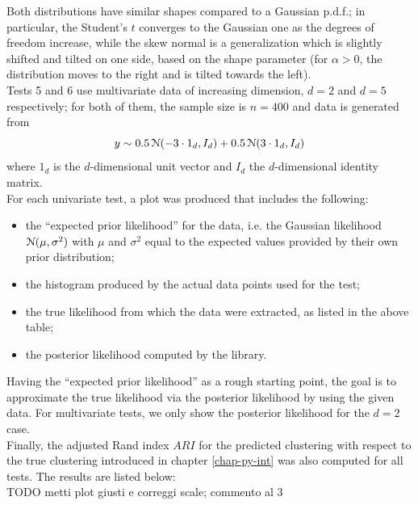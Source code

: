 Both distributions have similar shapes compared to a Gaussian p.d.f.; in particular, the Student's $t$ converges to the Gaussian one as the degrees of freedom increase, while the skew normal is a generalization which is slightly shifted and tilted on one side, based on the shape parameter (for $\alpha>0$, the distribution moves to the right and is tilted towards the left). \\
Tests 5 and 6 use multivariate data of increasing dimension, $d = 2$ and $d=5$ respectively; for both of them, the sample size is $n=400$ and data is generated from
$$y \sim 0.5 \, \mathcal N(-3 \cdot 1_d, I_d) + 0.5 \, \mathcal N(3 \cdot 1_d, I_d)$$
where $1_d$ is the $d$-dimensional unit vector and $I_d$ the $d$-dimensional identity matrix. \\
For each univariate test, a plot was produced that includes the following:
\begin{itemize}
	\item the ``expected prior likelihood'' for the data, i.e. the Gaussian likelihood $\mathcal N(\mu,\sigma^2)$ with $\mu$ and $\sigma^2$ equal to the expected values provided by their own prior distribution;
	\item the histogram produced by the actual data points used for the test;
	\item the true likelihood from which the data were extracted, as listed in the above table;
	\item the posterior likelihood computed by the library.
\end{itemize}
Having the ``expected prior likelihood'' as a rough starting point, the goal is to approximate the true likelihood via the posterior likelihood by using the given data.
For multivariate tests, we only show the posterior likelihood for the $d=2$ case. \\
Finally, the adjusted Rand index $ARI$ for the predicted clustering with respect to the true clustering introduced in chapter \ref{chap-py-int} was also computed for all tests.
The results are listed below:
\\ TODO metti plot giusti e correggi scale; commento al 3 \\
